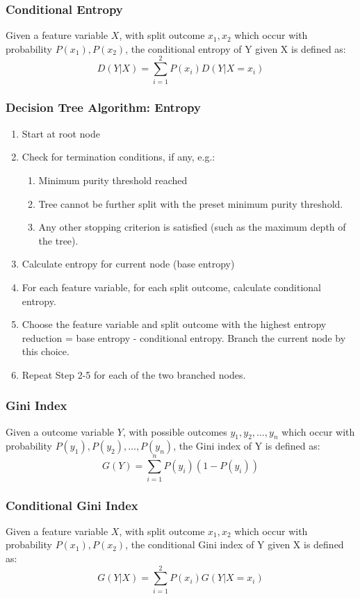 \documentclass[../../dsa1101_notes.Rtex]{subfiles}\usepackage[]{graphicx}\usepackage[]{color}
\begin{document}
\subsubsection{Conditional Entropy}
Given a feature variable \(X\), with split outcome \(x_1, x_2\) which occur with probability \(P(x_1), P(x_2)\), the conditional entropy of Y given X is defined as:
\[D(Y \vert X) = \sum_{i=1}^2 P(x_i) D(Y \vert X=x_i)\]

\subsubsection{Decision Tree Algorithm: Entropy}
\begin{enumerate}
    \item Start at root node
    \item Check for termination conditions, if any, e.g.:
    \begin{enumerate}
        \item Minimum purity threshold reached
        \item Tree cannot be further split with the preset minimum purity threshold.
        \item Any other stopping criterion is satisfied (such as the maximum depth of the tree).
    \end{enumerate}
    \item Calculate entropy for current node (base entropy)
    \item For each feature variable, for each split outcome, calculate conditional entropy.
    \item Choose the feature variable and split outcome with the highest entropy reduction = base entropy - conditional entropy. Branch the current node by this choice.
    \item Repeat Step 2-5 for each of the two branched nodes.
\end{enumerate}

\subsubsection{Gini Index}
Given a outcome variable \(Y\), with possible outcomes \(y_1, y_2, \ldots, y_n\) which occur with probability \(P(y_1), P(y_2), \ldots, P(y_n)\), the Gini index of Y is defined as:
\[G(Y)=\sum_{i=1}^n P(y_i)(1-P(y_i))\]

\subsubsection{Conditional Gini Index}
Given a feature variable \(X\), with split outcome \(x_1, x_2\) which occur with probability \(P(x_1), P(x_2)\), the conditional Gini index of Y given X is defined as:
\[G(Y \vert X) = \sum_{i=1}^2 P(x_i) G(Y \vert X=x_i)\]
\end{document}
